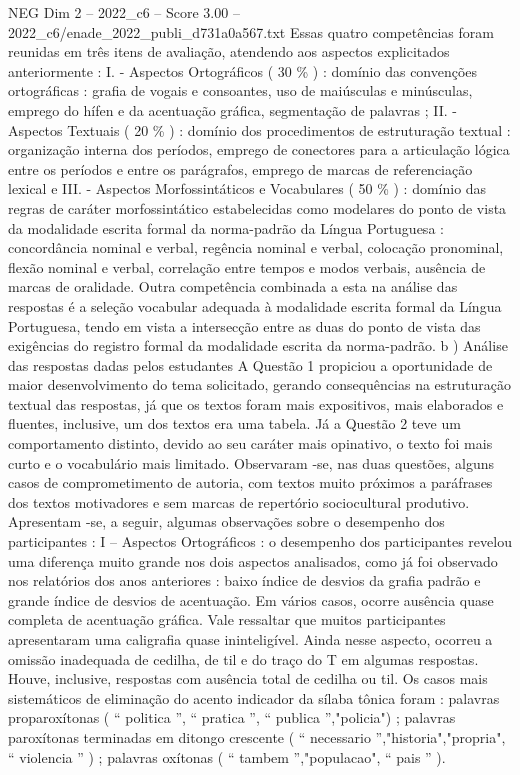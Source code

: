 \begin{textsample}{NEG Dim 2 – 2022\_c6 – Score 3.00 – 2022\_c6/enade\_2022\_publi\_d731a0a567.txt}
Essas quatro competências foram reunidas em três itens de avaliação, atendendo aos aspectos explicitados anteriormente : I. - Aspectos Ortográficos ( 30 \% ) : domínio das convenções ortográficas : grafia de vogais e consoantes, uso de maiúsculas e minúsculas, emprego do hífen e da acentuação gráfica, segmentação de palavras ; II. - Aspectos Textuais ( 20 \% ) : domínio dos procedimentos de estruturação textual : organização interna dos períodos, emprego de conectores para a articulação lógica entre os períodos e entre os parágrafos, emprego de marcas de referenciação lexical e III. - Aspectos Morfossintáticos e Vocabulares ( 50 \% ) : domínio das regras de caráter morfossintático estabelecidas como modelares do ponto de vista da modalidade escrita formal da norma-padrão da Língua Portuguesa : concordância nominal e verbal, regência nominal e verbal, colocação pronominal, flexão nominal e verbal, correlação entre tempos e modos verbais, ausência de marcas de oralidade.
Outra competência combinada a esta na análise das respostas é a seleção vocabular adequada à modalidade escrita formal da Língua Portuguesa, tendo em vista a intersecção entre as duas do ponto de vista das exigências do registro formal da modalidade escrita da norma-padrão. b ) Análise das respostas dadas pelos estudantes A Questão 1 propiciou a oportunidade de maior desenvolvimento do tema solicitado, gerando consequências na estruturação textual das respostas, já que os textos foram mais expositivos, mais elaborados e fluentes, inclusive, um dos textos era uma tabela.
Já a Questão 2 teve um comportamento distinto, devido ao seu caráter mais opinativo, o texto foi mais curto e o vocabulário mais limitado.
Observaram -se, nas duas questões, alguns casos de comprometimento de autoria, com textos muito próximos a paráfrases dos textos motivadores e sem marcas de repertório sociocultural produtivo.
Apresentam -se, a seguir, algumas observações sobre o desempenho dos participantes : I – Aspectos Ortográficos : o desempenho dos participantes revelou uma diferença muito grande nos dois aspectos analisados, como já foi observado nos relatórios dos anos anteriores : baixo índice de desvios da grafia padrão e grande índice de desvios de acentuação.
Em vários casos, ocorre ausência quase completa de acentuação gráfica.
Vale ressaltar que muitos participantes apresentaram uma caligrafia quase ininteligível.
Ainda nesse aspecto, ocorreu a omissão inadequada de cedilha, de til e do traço do T em algumas respostas.
Houve, inclusive, respostas com ausência total de cedilha ou til.
Os casos mais sistemáticos de eliminação do acento indicador da sílaba tônica foram : palavras proparoxítonas ( “ politica ”, “ pratica ”, “ publica ”,"policia") ; palavras paroxítonas terminadas em ditongo crescente ( “ necessario ”,"historia","propria", “ violencia ” ) ; palavras oxítonas ( “ tambem ”,"populacao", “ pais ” ).

\end{textsample}
